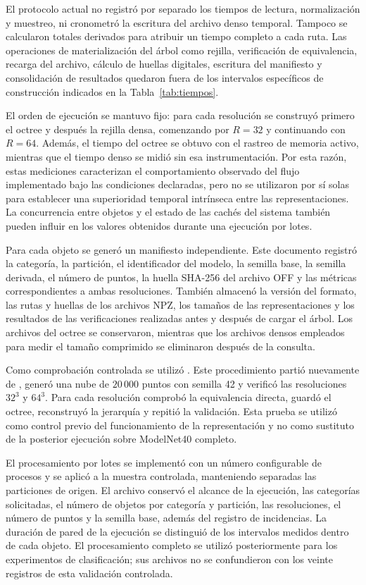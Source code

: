 El protocolo actual no registró por separado los tiempos de lectura, normalización y muestreo, ni cronometró la escritura del archivo denso temporal. Tampoco se calcularon totales derivados para atribuir un tiempo completo a cada ruta. Las operaciones de materialización del árbol como rejilla, verificación de equivalencia, recarga del archivo, cálculo de huellas digitales, escritura del manifiesto y consolidación de resultados quedaron fuera de los intervalos específicos de construcción indicados en la Tabla~\ref{tab:tiempos}.

El orden de ejecución se mantuvo fijo: para cada resolución se construyó primero el octree y después la rejilla densa, comenzando por $R=32$ y continuando con $R=64$. Además, el tiempo del octree se obtuvo con el rastreo de memoria activo, mientras que el tiempo denso se midió sin esa instrumentación. Por esta razón, estas mediciones caracterizan el comportamiento observado del flujo implementado bajo las condiciones declaradas, pero no se utilizaron por sí solas para establecer una superioridad temporal intrínseca entre las representaciones. La concurrencia entre objetos y el estado de las cachés del sistema también pueden influir en los valores obtenidos durante una ejecución por lotes.

Para cada objeto se generó un manifiesto independiente. Este documento registró la categoría, la partición, el identificador del modelo, la semilla base, la semilla derivada, el número de puntos, la huella SHA-256 del archivo OFF y las métricas correspondientes a ambas resoluciones. También almacenó la versión del formato, las rutas y huellas de los archivos NPZ, los tamaños de las representaciones y los resultados de las verificaciones realizadas antes y después de cargar el árbol. Los archivos del octree se conservaron, mientras que los archivos densos empleados para medir el tamaño comprimido se eliminaron después de la consulta.

Como comprobación controlada se utilizó \protect{}. Este procedimiento partió nuevamente de \protect{}, generó una nube de $20\,000$ puntos con semilla 42 y verificó las resoluciones $32^3$ y $64^3$. Para cada resolución comprobó la equivalencia directa, guardó el octree, reconstruyó la jerarquía y repitió la validación. Esta prueba se utilizó como control previo del funcionamiento de la representación y no como sustituto de la posterior ejecución sobre ModelNet40 completo.

El procesamiento por lotes se implementó con un número configurable de procesos y se aplicó a la muestra controlada, manteniendo separadas las particiones de origen. El archivo \protect{} conservó el alcance de la ejecución, las categorías solicitadas, el número de objetos por categoría y partición, las resoluciones, el número de puntos y la semilla base, además del registro de incidencias. La duración de pared de la ejecución se distinguió de los intervalos medidos dentro de cada objeto. El procesamiento completo se utilizó posteriormente para los experimentos de clasificación; sus archivos no se confundieron con los veinte registros de esta validación controlada.

